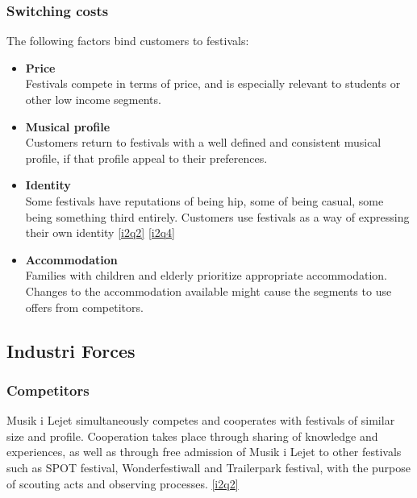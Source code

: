 \subsubsection{Switching costs}
The following factors bind customers to festivals:
\begin{itemize}
	\item \textbf{Price}\\
	Festivals compete in terms of price, and is especially relevant to students or other low income segments.
	\item \textbf{Musical profile}\\
	Customers return to festivals with a well defined and consistent musical profile, if that profile appeal to their preferences.
	\item \textbf{Identity}\\
	Some festivals have reputations of being hip, some of being casual, some being something third entirely. Customers use festivals as a way of expressing their own identity \ref{i2q2} \ref{i2q4}
	\item \textbf{Accommodation}\\
	Families with children and elderly prioritize appropriate accommodation. Changes to the accommodation available might cause the segments to use offers from competitors.
\end{itemize}
\subsection{Industri Forces}
\subsubsection{Competitors}
Musik i Lejet simultaneously competes and cooperates with festivals of similar size and profile. Cooperation takes place through sharing of knowledge and experiences, as well as through free admission of Musik i Lejet to other festivals such as SPOT festival, Wonderfestiwall and Trailerpark festival, with the purpose of scouting acts and observing processes. \ref{i2q2}

